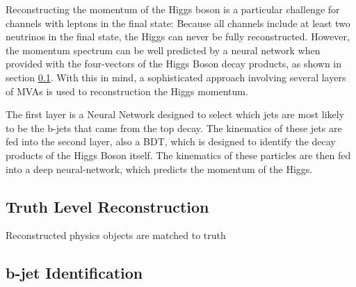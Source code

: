 Reconstructing the momentum of the Higgs boson is a particular challenge for channels with leptons in the final state: Because all channels include at least two neutrinos in the final state, the Higgs can never be fully reconstructed. However, the momentum spectrum can be well predicted by a neural network when provided with the four-vectors of the Higgs Boson decay products, as shown in section \ref{sec:truthLevelReco}. With this in mind, a sophisticated approach involving several layers of MVAs is used to reconstruction the Higgs momentum. 

The first layer is a Neural Network designed to select which jets are most likely to be the b-jets that came from the top decay. The kinematics of these jets are fed into the second layer, also a BDT, which is designed to identify the decay products of the Higgs Boson itself. The kinematics of these particles are then fed into a deep neural-network, which predicts the momentum of the Higgs.

\subsection{Truth Level Reconstruction}
\label{sec:truthLevelReco}

Reconstructed physics objects are matched to truth 

\subsection{b-jet Identification}
\label{sec:bjetID}

\begin{figure}
    \\
    \\
    \\
\end{figure}


